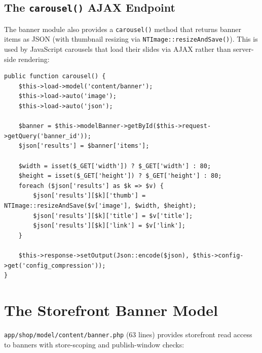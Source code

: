\documentclass[11pt,a4paper]{article}
\begin{document}
\subsection{The \texttt{carousel()} AJAX Endpoint}

The banner module also provides a \texttt{carousel()} method that
returns banner items as JSON (with thumbnail resizing via
\texttt{NTImage::resizeAndSave()}). This is used by JavaScript carousels
that load their slides via AJAX rather than server-side rendering:

\begin{lstlisting}[caption={\texttt{ControllerModuleBanner::carousel()} --- the AJAX endpoint.},label={lst:banner-carousel}]
public function carousel() {
    $this->load->model('content/banner');
    $this->load->auto('image');
    $this->load->auto('json');

    $banner = $this->modelBanner->getById($this->request->getQuery('banner_id'));
    $json['results'] = $banner['items'];

    $width = isset($_GET['width']) ? $_GET['width'] : 80;
    $height = isset($_GET['height']) ? $_GET['height'] : 80;
    foreach ($json['results'] as $k => $v) {
        $json['results'][$k]['thumb'] = NTImage::resizeAndSave($v['image'], $width, $height);
        $json['results'][$k]['title'] = $v['title'];
        $json['results'][$k]['link'] = $v['link'];
    }

    $this->response->setOutput(Json::encode($json), $this->config->get('config_compression'));
}
\end{lstlisting}

\section{The Storefront Banner Model}\label{sec:storefront-model}

\texttt{app/shop/model/content/banner.php} (63 lines) provides
storefront read access to banners with store-scoping and
publish-window checks:
\end{document}
